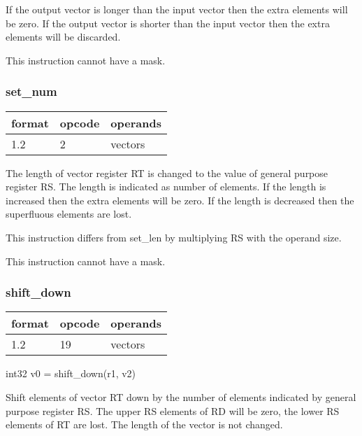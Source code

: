 \documentclass[forwardcom.tex]{subfiles}
\begin{document}
If the output vector is longer than the input vector then the extra elements will be zero. If the output vector is shorter than the input vector then the extra elements will be discarded. 
\vspace{2mm}

This instruction cannot have a mask.


\subsubsection{set\_num}
\label{table:setNumInstruction}
\begin{tabular}{|p{12mm}|p{12mm}|p{110mm}|}
\hline
\bfseries format & \bfseries opcode & \bfseries operands \\ \hline
1.2 & 2 & vectors \\ \hline
\end{tabular}
\vspace{2mm}

The length of vector register RT is changed to the value of general purpose register RS. The length is indicated as number of elements. If the length is increased then the extra elements will be zero. If the length is decreased then the superfluous elements are lost.

\vspace{2mm}
This instruction differs from set\_len by multiplying RS with the operand size.

This instruction cannot have a mask.


\subsubsection{shift\_down}
\label{table:shiftDownInstruction}
\begin{tabular}{|p{12mm}|p{12mm}|p{110mm}|}
\hline
\bfseries format & \bfseries opcode & \bfseries operands \\ \hline
1.2 & 19 & vectors \\ \hline
\end{tabular}
\vspace{2mm}

int32 v0 = shift\_down(r1, v2)
\vspace{2mm}

Shift elements of vector RT down by the number of elements indicated by general purpose register RS. 
The upper RS elements of RD will be zero, the lower RS elements of RT are lost. The length of the vector is not changed.
\vspace{2mm}
\end{document}
